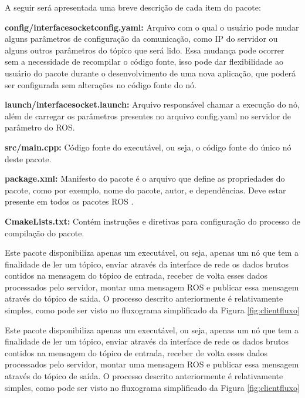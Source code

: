 A seguir será apresentada uma breve descrição de cada item do pacote:
 
\textbf{config/interface\underline{\hspace{.07in}}socket\underline{\hspace{.07in}}config.yaml:} Arquivo com o qual o usuário pode mudar alguns parâmetros de configuração da comunicação, como IP do servidor ou alguns outros parâmetros do tópico que será lido. Essa mudança pode ocorrer sem a necessidade de recompilar o código fonte, isso pode dar flexibilidade ao usuário do pacote durante o desenvolvimento de uma nova aplicação, que poderá ser configurada sem alterações no código fonte do nó. 

\textbf{launch/interface\underline{\hspace{.07in}}socket.launch:} Arquivo responsável chamar a execução do nó, além de carregar os parâmetros presentes no arquivo config.yaml no servidor de parâmetro do ROS.

\textbf{src/main.cpp:} Código fonte do executável, ou seja, o código fonte do único nó deste pacote.

\textbf{package.xml:} Manifesto do pacote é o arquivo que define as propriedades do pacote, como por exemplo, nome do pacote, autor, e dependências. Deve estar presente em todos os pacotes ROS \cite{RosPkgXml}.


\textbf{CmakeLists.txt:} Contém instruções e diretivas para configuração do processo de compilação do pacote.

Este pacote disponibiliza apenas um executável, ou seja, apenas um nó que tem a finalidade de ler um tópico, enviar através da interface de rede os dados brutos contidos na mensagem do tópico de entrada, receber de volta esses dados processados pelo servidor, montar uma mensagem ROS e publicar essa mensagem através do tópico de saída. O processo descrito anteriormente é relativamente simples, como pode ser visto no fluxograma simplificado da Figura \ref{fig:clientfluxo}

Este pacote disponibiliza apenas um executável, ou seja, apenas um nó que tem a finalidade de ler um tópico, enviar através da interface de rede os dados brutos contidos na mensagem do tópico de entrada, receber de volta esses dados processados pelo servidor, montar uma mensagem ROS e publicar essa mensagem através do tópico de saída. O processo descrito anteriormente é relativamente simples, como pode ser visto no fluxograma simplificado da Figura \ref{fig:clientfluxo}

